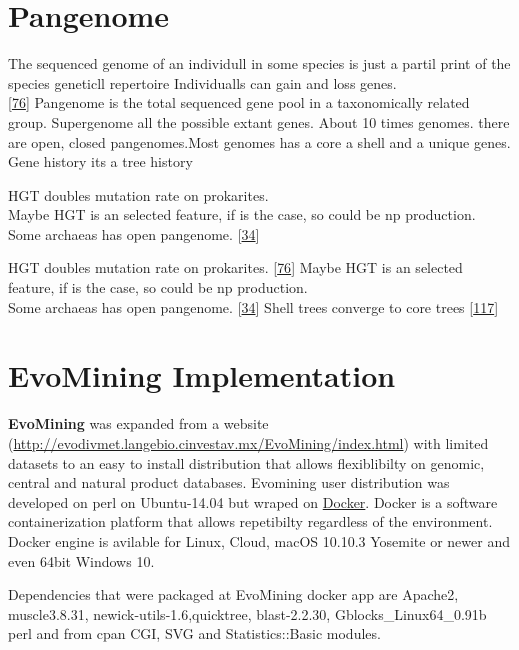 \documentclass[12pt,twoside]{reedthesis}
\begin{document}
  \section{Pangenome}\label{pangenome}
  
  The sequenced genome of an individull in some species is just a partil
  print of the species geneticll repertoire Individualls can gain and loss
  genes.\\
  {[}\protect\hyperlink{ref-koonin_turbulent_2015}{76}{]} Pangenome is the
  total sequenced gene pool in a taxonomically related group. Supergenome
  all the possible extant genes. About 10 times genomes. there are open,
  closed pangenomes.Most genomes has a core a shell and a unique genes.\\
  Gene history its a tree history
  
  HGT doubles mutation rate on prokarites.\\
  Maybe HGT is an selected feature, if is the case, so could be np
  production.\\
  Some archaeas has open pangenome.
  {[}\protect\hyperlink{ref-halachev_calculating_2011}{34}{]}
  
  HGT doubles mutation rate on prokarites.
  {[}\protect\hyperlink{ref-koonin_turbulent_2015}{76}{]} Maybe HGT is an
  selected feature, if is the case, so could be np production.\\
  Some archaeas has open pangenome.
  {[}\protect\hyperlink{ref-halachev_calculating_2011}{34}{]} Shell trees
  converge to core trees
  {[}\protect\hyperlink{ref-narechania_random_2012}{117}{]}
  
  \section{EvoMining Implementation}\label{evomining-implementation}
  
  \textbf{EvoMining} was expanded from a website
  (\url{http://evodivmet.langebio.cinvestav.mx/EvoMining/index.html}) with
  limited datasets to an easy to install distribution that allows
  flexiblibilty on genomic, central and natural product databases.
  Evomining user distribution was developed on perl on Ubuntu-14.04 but
  wraped on \href{https://www.docker.com/}{Docker}. Docker is a software
  containerization platform that allows repetibilty regardless of the
  environment. Docker engine is avilable for Linux, Cloud, macOS 10.10.3
  Yosemite or newer and even 64bit Windows 10.
  
  Dependencies that were packaged at EvoMining docker app are Apache2,
  muscle3.8.31, newick-utils-1.6,quicktree, blast-2.2.30,
  Gblocks\_Linux64\_0.91b perl and from cpan CGI, SVG and
  Statistics::Basic modules.
  
\end{document}
